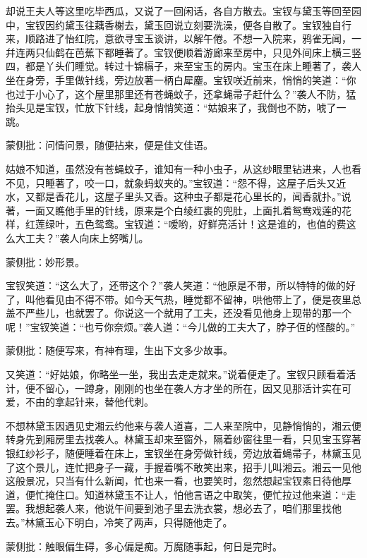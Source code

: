\begin{parag}
    却说王夫人等这里吃毕西瓜，又说了一回闲话，各自方散去。宝钗与黛玉等回至园中，宝钗因约黛玉往藕香榭去，黛玉回说立刻要洗澡，便各自散了。宝钗独自行来，顺路进了怡红院，意欲寻宝玉谈讲，以解午倦。不想一入院来，鸦雀无闻，一幷连两只仙鹤在芭蕉下都睡著了。宝钗便顺着游廊来至房中，只见外间床上横三竖四，都是丫头们睡觉。转过十锦槅子，来至宝玉的房内。宝玉在床上睡著了，袭人坐在身旁，手里做针线，旁边放著一柄白犀麈。宝钗咲近前来，悄悄的笑道：“你也过于小心了，这个屋里那里还有苍蝇蚊子，还拿蝇帚子赶什么？”袭人不防，猛抬头见是宝钗，忙放下针线，起身悄悄笑道：“姑娘来了，我倒也不防，唬了一跳。\begin{note}蒙侧批：问情问景，随便拈来，便是佳文佳语。\end{note}姑娘不知道，虽然没有苍蝇蚊子，谁知有一种小虫子，从这纱眼里钻进来，人也看不见，只睡著了，咬一口，就象蚂蚁夹的。”宝钗道：“怨不得，这屋子后头又近水，又都是香花儿，这屋子里头又香。这种虫子都是花心里长的，闻香就扑。”说著，一面又瞧他手里的针线，原来是个白绫红裹的兜肚，上面扎着鸳鸯戏莲的花样，红莲绿叶，五色鸳鸯。宝钗道：“嗳哟，好鲜亮活计！这是谁的，也值的费这么大工夫？”袭人向床上努嘴儿。\begin{note}蒙侧批：妙形景。\end{note}宝钗笑道：“这么大了，还带这个？”袭人笑道：“他原是不带，所以特特的做的好了，叫他看见由不得不带。如今天气热，睡觉都不留神，哄他带上了，便是夜里总盖不严些儿，也就罢了。你说这一个就用了工夫，还没看见他身上现带的那一个呢！”宝钗笑道：“也亏你奈烦。”袭人道：“今儿做的工夫大了，脖子仾的怪酸的。”\begin{note}蒙侧批：随便写来，有神有理，生出下文多少故事。\end{note}又笑道：“好姑娘，你略坐一坐，我出去走走就来。”说着便走了。宝钗只顾看着活计，便不留心，一蹲身，刚刚的也坐在袭人方才坐的所在，因又见那活计实在可爱，不由的拿起针来，替他代刺。
\end{parag}


\begin{parag}
    不想林黛玉因遇见史湘云约他来与袭人道喜，二人来至院中，见静悄悄的，湘云便转身先到厢房里去找袭人。林黛玉却来至窗外，隔着纱窗往里一看，只见宝玉穿著银红纱衫子，随便睡着在床上，宝钗坐在身旁做针线，旁边放着蝇帚子，林黛玉见了这个景儿，连忙把身子一藏，手握着嘴不敢笑出来，招手儿叫湘云。湘云一见他这般景况，只当有什么新闻，忙也来一看，也要笑时，忽然想起宝钗素日待他厚道，便忙掩住口。知道林黛玉不让人，怕他言语之中取笑，便忙拉过他来道：“走罢。我想起袭人来，他说午间要到池子里去洗衣裳，想必去了，咱们那里找他去。”林黛玉心下明白，冷笑了两声，只得随他走了。\begin{note}蒙侧批：触眼偏生碍，多心偏是痴。万魔随事起，何日是完时。\end{note}
\end{parag}


